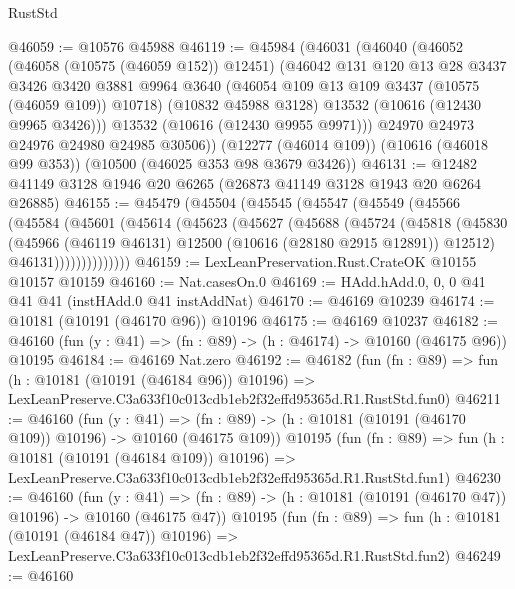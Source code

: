 \begin{lexlean}{RustStd}
\begin{coremodule}
@46059 := @10576 @45988
@46119 := @45984
    (@46031
      (@46040
        (@46052
          (@46058 (@10575 (@46059 @152)) @12451)
          (@46042
            @131
            @120
            @13
            @28
            @3437
            @3426
            @3420
            @3881
            @9964
            @3640
            (@46054 @109 @13 @109 @3437 (@10575 (@46059 @109)) @10718)
            (@10832 @45988 @3128)
            @13532
            (@10616 (@12430 @9965 @3426)))
          @13532
          (@10616 (@12430 @9955 @9971)))
        @24970
        @24973
        @24976
        @24980
        @24985
        @30506))
    (@12277 (@46014 @109))
    (@10616 (@46018 @99 @353))
    (@10500 (@46025 @353 @98 @3679 @3426))
@46131 := @12482 @41149 @3128 @1946 @20 @6265 (@26873 @41149 @3128 @1943 @20 @6264 @26885)
@46155 := @45479
    (@45504
      (@45545
        (@45547
          (@45549
            (@45566
              (@45584
                (@45601
                  (@45614
                    (@45623
                      (@45627
                        (@45688
                          (@45724
                            (@45818
                              (@45830
                                (@45966
                                  (@46119 @46131)
                                  @12500
                                  (@10616 (@28180 @2915 @12891))
                                  @12512)
                                @46131))))))))))))))
@46159 := LexLeanPreservation.Rust.CrateOK @10155 @10157 @10159
@46160 := Nat.casesOn.{0}
@46169 := HAdd.hAdd.{0, 0, 0} @41 @41 @41 (instHAdd.{0} @41 instAddNat)
@46170 := @46169 @10239
@46174 := @10181 (@10191 (@46170 @96)) @10196
@46175 := @46169 @10237
@46182 := @46160 (fun (y : @41) => (fn : @89) -> (h : @46174) -> @10160 (@46175 @96)) @10195
@46184 := @46169 Nat.zero
@46192 := @46182
    (fun (fn : @89) =>
    fun (h : @10181 (@10191 (@46184 @96)) @10196) =>
    LexLeanPreserve.C3a633f10c013cdb1eb2f32effd95365d.R1.RustStd.fun0)
@46211 := @46160
    (fun (y : @41) =>
    (fn : @89) -> (h : @10181 (@10191 (@46170 @109)) @10196) -> @10160 (@46175 @109))
    @10195
    (fun (fn : @89) =>
    fun (h : @10181 (@10191 (@46184 @109)) @10196) =>
    LexLeanPreserve.C3a633f10c013cdb1eb2f32effd95365d.R1.RustStd.fun1)
@46230 := @46160
    (fun (y : @41) =>
    (fn : @89) -> (h : @10181 (@10191 (@46170 @47)) @10196) -> @10160 (@46175 @47))
    @10195
    (fun (fn : @89) =>
    fun (h : @10181 (@10191 (@46184 @47)) @10196) =>
    LexLeanPreserve.C3a633f10c013cdb1eb2f32effd95365d.R1.RustStd.fun2)
@46249 := @46160

\end{coremodule}
\end{lexlean}
